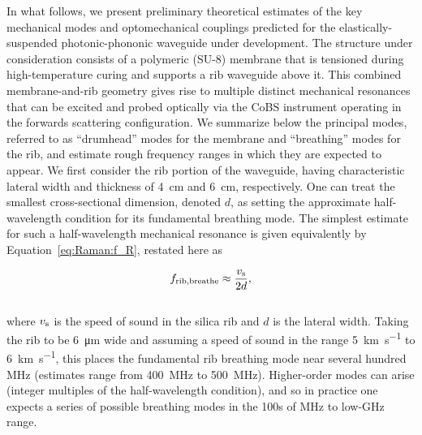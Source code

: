In what follows, we present preliminary theoretical estimates of the key mechanical modes and optomechanical couplings predicted for the elastically-suspended photonic-phononic waveguide under development. The structure under consideration consists of a polymeric (SU-8) membrane that is tensioned during high-temperature curing and supports a rib waveguide above it. This combined membrane-and-rib geometry gives rise to multiple distinct mechanical resonances that can be excited and probed optically via the \ac{CoBS} instrument operating in the forwards scattering configuration. We summarize below the principal modes, referred to as ``drumhead'' modes for the membrane and ``breathing'' modes for the rib, and estimate rough frequency ranges in which they are expected to appear. We first consider the rib portion of the waveguide, having characteristic lateral width and thickness of \SI{4}{\centi\meter} and \SI{6}{\centi\meter}, respectively. One can treat the smallest cross-sectional dimension, denoted \(d\), as setting the approximate half-wavelength condition for its fundamental breathing mode. The simplest estimate for such a half-wavelength mechanical resonance is given equivalently by Equation~\ref{eq:Raman:f_R}, restated here as

\begin{equation}
f_{\rm rib,breathe} \approx \frac{v_{\rm s}}{2d},
\end{equation}
\\
where \(v_{\rm s}\) is the speed of sound in the silica rib and \(d\) is the lateral width. Taking the rib to be \SI{6}{\micro\meter} wide and assuming a speed of sound in the range \SI{5}{\kilo\meter\per\second} to \SI{6}{\kilo\meter\per\second}, this places the fundamental rib breathing mode near several hundred \si{\mega\hertz} (estimates range from \SI{400}{\mega\hertz} to \SI{500}{\mega\hertz}). Higher-order modes can arise (integer multiples of the half-wavelength condition), and so in practice one expects a series of possible breathing modes in the 100s of \si{\mega\hertz} to low-\si{\giga\hertz} range.

